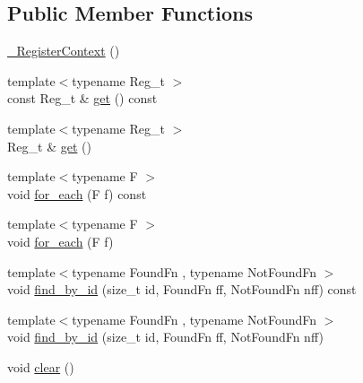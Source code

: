 \subsection*{Public Member Functions}
\begin{DoxyCompactItemize}
\item 
\mbox{\hyperlink{classxd_1_1reg_1_1___register_context_3_01__base_00_01_register__t_00_01_registers__t_8_8_8_01_4_a6d6d8f5118746650a3ee6fdb89312483}{\+\_\+\+Register\+Context}} ()
\item 
{\footnotesize template$<$typename Reg\+\_\+t $>$ }\\const Reg\+\_\+t \& \mbox{\hyperlink{classxd_1_1reg_1_1___register_context_3_01__base_00_01_register__t_00_01_registers__t_8_8_8_01_4_ae7a0a03b0264c491f57d8838a76bf1f6}{get}} () const
\item 
{\footnotesize template$<$typename Reg\+\_\+t $>$ }\\Reg\+\_\+t \& \mbox{\hyperlink{classxd_1_1reg_1_1___register_context_3_01__base_00_01_register__t_00_01_registers__t_8_8_8_01_4_a7761459e14d2e840cf08b6c70b2b67b1}{get}} ()
\item 
{\footnotesize template$<$typename F $>$ }\\void \mbox{\hyperlink{classxd_1_1reg_1_1___register_context_3_01__base_00_01_register__t_00_01_registers__t_8_8_8_01_4_a26395d6a40335ce26e8d5dd46255f30e}{for\+\_\+each}} (F f) const
\item 
{\footnotesize template$<$typename F $>$ }\\void \mbox{\hyperlink{classxd_1_1reg_1_1___register_context_3_01__base_00_01_register__t_00_01_registers__t_8_8_8_01_4_affaf2c446157baaca2839c604f7de614}{for\+\_\+each}} (F f)
\item 
{\footnotesize template$<$typename Found\+Fn , typename Not\+Found\+Fn $>$ }\\void \mbox{\hyperlink{classxd_1_1reg_1_1___register_context_3_01__base_00_01_register__t_00_01_registers__t_8_8_8_01_4_ab445d0ac038a0add80fd5cff0feb0522}{find\+\_\+by\+\_\+id}} (size\+\_\+t id, Found\+Fn ff, Not\+Found\+Fn nff) const
\item 
{\footnotesize template$<$typename Found\+Fn , typename Not\+Found\+Fn $>$ }\\void \mbox{\hyperlink{classxd_1_1reg_1_1___register_context_3_01__base_00_01_register__t_00_01_registers__t_8_8_8_01_4_aa4be413d1af88965261cfd36820f477b}{find\+\_\+by\+\_\+id}} (size\+\_\+t id, Found\+Fn ff, Not\+Found\+Fn nff)
\item 
void \mbox{\hyperlink{classxd_1_1reg_1_1___register_context_3_01__base_00_01_register__t_00_01_registers__t_8_8_8_01_4_a5522427355143c300b7eaddab9374a8d}{clear}} ()
\end{DoxyCompactItemize}
